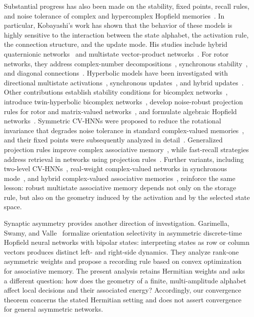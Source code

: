\documentclass[10pt,journal,letterpaper]{IEEEtran}
\begin{document}
Substantial progress has also been made on the stability, fixed points, recall rules, and noise tolerance of complex and hypercomplex Hopfield memories~\cite{castro2018stability}. In particular, Kobayashi's work has shown that the behavior of these models is highly sensitive to the interaction between the state alphabet, the activation rule, the connection structure, and the update mode. His studies include hybrid quaternionic networks~\cite{kobayashi2014hybrid} and multistate vector-product networks~\cite{kobayashi2017vectorproduct}. For rotor networks, they address complex-number decompositions~\cite{kobayashi2017decomposition}, synchronous stability~\cite{kobayashi2018rotorstability}, and diagonal connections~\cite{kobayashi2020diagonalrotor}. Hyperbolic models have been investigated with directional multistate activations~\cite{kobayashi2018hyperbolic}, synchronous updates~\cite{kobayashi2020hyperbolicsync}, and hybrid updates~\cite{kobayashi2021hyperbolichybrid}. Other contributions establish stability conditions for bicomplex networks~\cite{kobayashi2021bicomplexstability}, introduce twin-hyperbolic bicomplex networks~\cite{kobayashi2021bicomplextwin}, develop noise-robust projection rules for rotor and matrix-valued networks~\cite{kobayashi2022noise}, and formulate algebraic Hopfield networks~\cite{kobayashi2025algebraic}. Symmetric CV-HNNs were proposed to reduce the rotational invariance that degrades noise tolerance in standard complex-valued memories~\cite{kobayashi2017symmetric}, and their fixed points were subsequently analyzed in detail~\cite{kobayashi2018fixed}. Generalized projection rules improve complex associative memory~\cite{lee2001}, while fast-recall strategies address retrieval in networks using projection rules~\cite{kobayashi2017fastrecall}. Further variants, including two-level CV-HNNs~\cite{kobayashi2021twolevel}, real-weight complex-valued networks in synchronous mode~\cite{kobayashi2021realweights}, and hybrid complex-valued associative memories~\cite{kobayashi2025hybrid}, reinforce the same lesson: robust multistate associative memory depends not only on the storage rule, but also on the geometry induced by the activation and by the selected state space.

Synaptic asymmetry provides another direction of investigation.
Garimella, Swamy, and Valle~\cite{garimella2026orientation} formalize orientation
selectivity in asymmetric discrete-time Hopfield neural networks with bipolar states: interpreting
states as row or column vectors produces distinct left- and right-side
dynamics. They analyze rank-one asymmetric weights and propose a recording
rule based on convex optimization for associative memory. The present
analysis retains Hermitian weights and asks a different question: how does
the geometry of a finite, multi-amplitude alphabet affect local decisions
and their associated energy? Accordingly, our convergence theorem concerns
the stated Hermitian setting and does not assert convergence for general
asymmetric networks.
\end{document}
